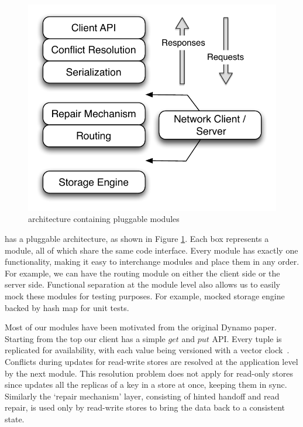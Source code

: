 \begin{figure}
  \centering
    \includegraphics[scale=0.55]{images/arch.pdf}
  \caption{\projectname{} architecture containing pluggable modules}
  \label{arch}
\end{figure}

\projectname{} has a pluggable architecture, as shown in Figure \ref{arch}. Each box represents a module, all of which share the same code interface. Every module has exactly one functionality, making it easy to interchange modules and place them in any order. For example, we can have the routing module on either the client side or the server side. Functional separation at the module level also allows us to easily mock these modules for testing purposes. For example, mocked storage engine backed by hash map for unit tests. 

Most of our modules have been motivated from the original Dynamo paper. Starting from the top our client has a simple $get$ and $put$ API. Every tuple is replicated for availability, with each value being versioned with a vector clock~\cite{lamport}. Conflicts during updates for read-write stores are resolved at the application level by the next module. This resolution problem does not apply for read-only stores since \projectname{} updates all the replicas of a key in a store at once, keeping them in sync. Similarly the `repair mechanism' layer, consisting of hinted handoff and read repair, is used only by read-write stores to bring the data back to a consistent state. 


